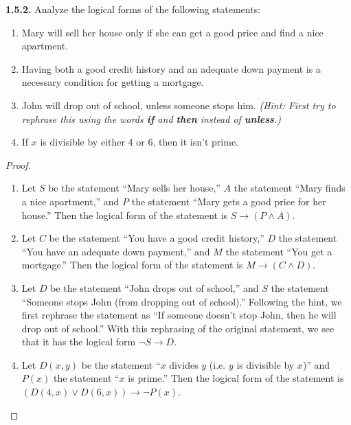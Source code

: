 \documentclass[12pt]{amsart}
\newenvironment{statement}[1]{\smallskip\noindent\color[rgb]{.6627, .3529, .6314} {\bf #1.}}{}
\theoremstyle{definition}
\theoremstyle{remark}
\begin{document}
\begin{statement}{1.5.2}
Analyze the logical forms of the following statements:
\begin{enumerate}
	\item Mary will sell her house only if she can get a good price and find a nice apartment.
	
	\item Having both a good credit history and an adequate down payment is a necessary condition for getting a mortgage.
	
	\item John will drop out of school, unless someone stops him.
	\emph{(Hint: First try to rephrase this using the words \textbf{if} and \textbf{then} instead of \textbf{unless}.)}
	
	\item If $x$ is divisible by either 4 or 6, then it isn't prime.
\end{enumerate}
\end{statement}

\begin{proof}
\hfill
\begin{enumerate}
	\item Let $S$ be the statement ``Mary sells her house,'' $A$ the statement ``Mary finds a nice apartment,'' and $P$ the statement ``Mary gets a good price for her house.''
	Then the logical form of the statement is $S \rightarrow (P \wedge A)$.
	
	\item Let $C$ be the statement ``You have a good credit history,'' $D$ the statement ``You have an adequate down payment,'' and $M$ the statement ``You get a mortgage.''
	Then the logical form of the statement is $M \rightarrow (C \wedge D)$.
	
	\item Let $D$ be the statement ``John drops out of school,'' and $S$ the statement ``Someone stops John (from dropping out of school).''
	Following the hint, we first rephrase the statement as ``If someone doesn't stop John, then he will drop out of school.''
	With this rephrasing of the original statement, we see that it has the logical form $\neg S \rightarrow D$.
	
	\item Let $D(x, y)$ be the statement ``$x$ divides $y$ (i.e. $y$ is divisible by $x$)'' and $P(x)$ the statement ``$x$ is prime.''
	Then the logical form of the statement is $(D(4, x) \vee D(6, x)) \rightarrow \neg P(x)$.
\end{enumerate}
\end{proof}
\end{document}
